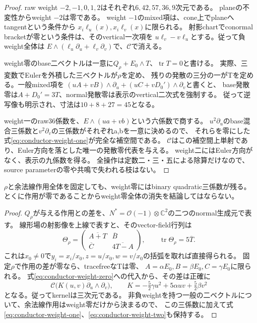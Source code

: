 \begin{proof}
raw weight $-2,-1,0,1,2$はそれぞれ$6,42,57,36,9$次元である。
planeの不変性からweight $-2$は零である。
weight $-1$のmixed項は、cone上でplaneへtangentという条件から
$x_i\ell_u(x),x_i\ell_v(x)$に限られる。
射影chartでconormal bracketが零という条件は、そのvertical一次項を
$u\ell_v-v\ell_u$とする。従って負weight全体は
$E\wedge(\ell_u\partial_u+\ell_v\partial_v)$で、$\mathcal C$で消える。

weight零のbase二ベクトルは一意に$Q_\rho+E_0\wedge T$、$\operatorname{tr}T=0$と書ける。
実際、三変数でEulerを外積した三ベクトルが$\rho$を定め、
残りの発散の三分の一がTを定める。一般mixed項を
$(uA+vB)\wedge\partial_u+(uC+vD_0')\wedge\partial_v$と書くと、
base発散零は$A+D_0'=3T$、normal発散零は表示のvertical二次式を強制する。
従って逆写像も明示され、寸法は$10+8+27=45$となる。

weight一のraw36係数を、$E\wedge(ua+vb)$という六係数で商する。
$u^2\partial_u$のbase混合三係数と$v^2\partial_v$の三係数がそれぞれa,bを一意に決めるので、
それらを零にした式\eqref{eq:conductor-weight-one}が完全な補空間である。
$\mathcal C$はこの補空間上単射であり、Euler方向を落とした唯一の発散零代表を与える。
weight二にはEuler方向がなく、表示の九係数を得る。
全操作は定数二・三・五による除算だけなので、source parameterの零や共鳴で失われる枝はない。
\end{proof}

\begin{proposition}\label{prop:conductor-hidden-quadratic}
$\rho$と余法線作用全体を固定しても、weight零にはbinary quadratic三係数が残る。
とくに作用が零であることからweight零全体の消失を結論してはならない。
\end{proposition}
\begin{proof}
$Q_\rho$が与える作用との差を、$N^*=\mathcal O(-1)\otimes\mathbb C^2$の二つのnormal生成元で表す。
線形場の射影像を上線で表すと、そのvector-field行列は
\[
 \Theta_\rho=\begin{pmatrix}
 \overline{A+T}&\overline B\\
 \overline C&\overline{4T-A}
 \end{pmatrix},\qquad \operatorname{tr}\Theta_\rho=5\overline T.
\]
これは$x_0\ne0$で$y_i=x_i/x_0,z=u/x_0,w=v/x_0$の括弧を取れば直接得られる。
固定$\rho$で作用の差が零なら、tracefreeなTは零、
$A=\alpha E_0,B=\beta E_0,C=\gamma E_0$に限られる。
式\eqref{eq:conductor-weight-zero}への代入から、その差は正確に
\[
 \mathcal C\bigl(K(u,v)\partial_u\wedge\partial_v\bigr),\qquad
 K=-\tfrac52\gamma u^2+5\alpha uv+\tfrac52\beta v^2
\]
となる。従ってkernelは三次元である。
非負weightを持つ一般の二ベクトルについて、余法線作用はweight零だけから決まるので、
この三係数に加えて式\eqref{eq:conductor-weight-one}、\eqref{eq:conductor-weight-two}も保持する。
\end{proof}

